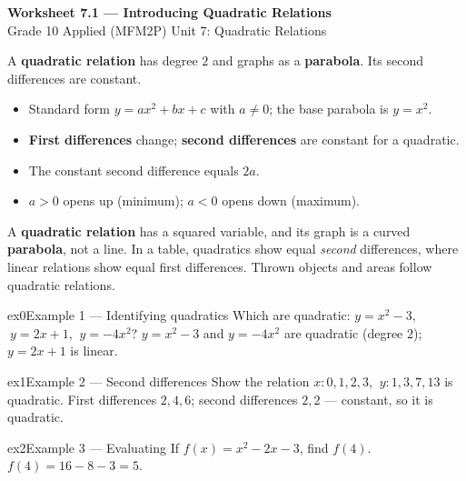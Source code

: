 \documentclass[11pt]{article}
\begin{document}
\begin{center}
{\LARGE\bfseries\color{titleblue}Worksheet 7.1 --- Introducing Quadratic Relations}\\[2pt]
{\small Grade 10 Applied (MFM2P) \textperiodcentered{} Unit 7: Quadratic Relations}
\end{center}

\begin{ideabox}
A \textbf{quadratic relation} has degree $2$ and graphs as a \textbf{parabola}. Its second differences are constant.
\begin{itemize}[leftmargin=*,itemsep=2pt]
  \item Standard form $y=ax^2+bx+c$ with $a\neq0$; the base parabola is $y=x^2$.
  \item \textbf{First differences} change; \textbf{second differences} are constant for a quadratic.
  \item The constant second difference equals $2a$.
  \item $a>0$ opens up (minimum); $a<0$ opens down (maximum).
\end{itemize}
\end{ideabox}

\begin{learnbox}
A \textbf{quadratic relation} has a squared variable, and its graph is a curved \textbf{parabola}, not a line.
In a table, quadratics show equal \emph{second} differences, where linear relations show equal first differences.
Thrown objects and areas follow quadratic relations.
\end{learnbox}


\begin{example}{ex0}{Example 1 --- Identifying quadratics}
Which are quadratic: $y=x^2-3$, $\ y=2x+1$, $\ y=-4x^2$?
\soln $y=x^2-3$ and $y=-4x^2$ are quadratic (degree $2$); $y=2x+1$ is linear.
\end{example}

\begin{example}{ex1}{Example 2 --- Second differences}
Show the relation $x:0,1,2,3$, $\ y:1,3,7,13$ is quadratic.
\soln First differences $2,4,6$; second differences $2,2$ --- constant, so it is quadratic.
\end{example}

\begin{example}{ex2}{Example 3 --- Evaluating}
If $f(x)=x^2-2x-3$, find $f(4)$.
\soln $f(4)=16-8-3=5.$
\end{example}
\end{document}

